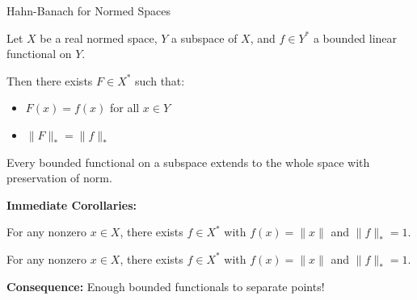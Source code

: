 \documentclass[aspectratio=169,10pt]{beamer}
\begin{document}
\begin{frame}{Hahn-Banach for Normed Spaces}
  \begin{theorem}
    Let $X$ be a real normed space, $Y$ a subspace of $X$, and $f \in Y^*$ a bounded linear functional on $Y$.

    Then there exists $F \in X^*$ such that:
    \begin{itemize}
      \item $F(x) = f(x)$ for all $x \in Y$
      \item $\|F\|_* = \|f\|_*$
    \end{itemize}

    Every bounded functional on a subspace extends to the whole space with preservation of norm.
  \end{theorem}

  \vspace{0.3cm}
  \textbf{Immediate Corollaries:}

  \begin{corollary}[Corollary 1.2]
    For any nonzero $x \in X$, there exists $f \in X^*$ with $f(x) = \|x\|$ and $\|f\|_* = 1$.
  \end{corollary}

  \begin{corollary}[Corollary 1.3]
    For any nonzero $x \in X$, there exists $f \in X^*$ with $f(x) = \|x\|$ and $\|f\|_* = 1$.
  \end{corollary}

  \vspace{0.2cm}
  \textbf{Consequence:} Enough bounded functionals to separate points!
\end{frame}
\end{document}
